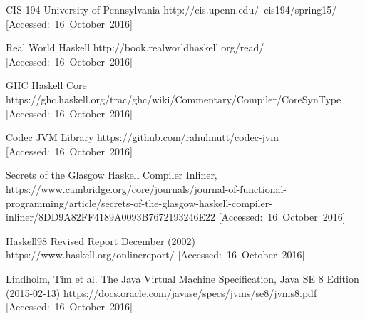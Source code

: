 \documentclass[a4paper]{article}
\begin{document}
  \begin{thebibliography}{}
    CIS 194 University of Pennsylvania
    http://cis.upenn.edu/~cis194/spring15/  
    \hbox{[Accessed: 16 October 2016]}

    Real World Haskell
    http://book.realworldhaskell.org/read/ 
    \hbox{[Accessed: 16 October 2016]}

    GHC Haskell Core
    https://ghc.haskell.org/trac/ghc/wiki/Commentary/Compiler/CoreSynType
    \hbox{[Accessed: 16 October 2016]}


    Codec JVM Library
    https://github.com/rahulmutt/codec-jvm  
    \hbox{[Accessed: 16 October 2016]}

    Secrets of the Glasgow Haskell Compiler Inliner,
    https://www.cambridge.org/core/journals/journal-of-functional-programming/article/secrets-of-the-glasgow-haskell-compiler-inliner/8DD9A82FF4189A0093B7672193246E22   
    \hbox{[Accessed: 16 October 2016]}

    Haskell98 Revised Report December (2002)
    https://www.haskell.org/onlinereport/
    \hbox{[Accessed: 16 October 2016]}

    Lindholm, Tim et al.
    The Java Virtual Machine Specification, Java SE 8 Edition (2015-02-13)
    https://docs.oracle.com/javase/specs/jvms/se8/jvms8.pdf 
    \hbox{[Accessed: 16 October 2016]}


  \end{thebibliography}
\end{document}
